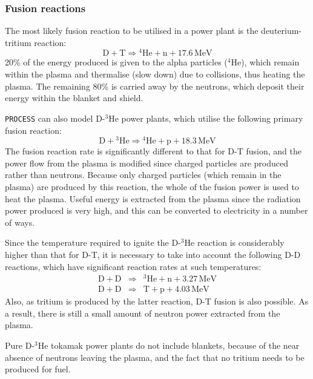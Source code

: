\documentclass[11pt,a4paper]{report}
\newcommand{\process}{\mbox{\texttt{PROCESS}}}
\begin{document}
\subsubsection{Fusion reactions}

The most likely fusion reaction to be utilised in a power plant is the
deuterium-tritium reaction:
\begin{equation}
\mathrm{D + T} \Longrightarrow \mathrm{^{4}He + n + 17.6 \,MeV}
\label{eq:d-t}
\end{equation}
20\% of the energy produced is given to the alpha particles ($^4$He), which
remain within the plasma and thermalise (slow down) due to collisions, thus
heating the plasma. The remaining 80\% is carried away by the neutrons, which
deposit their energy within the blanket and shield.

\process\/ can also model D-$^3$He power plants, which utilise the following primary
fusion reaction:
\begin{equation}
\mathrm{D + \mbox{$^3$He}} \Longrightarrow \mathrm{^{4}He + p + 18.3 \,MeV}
\label{eq:dhe3}
\end{equation}
The fusion reaction rate is significantly different to that for D-T fusion,
and the power flow from the plasma is modified since charged particles are
produced rather than neutrons. Because only charged particles (which remain in
the plasma) are produced by this reaction, the whole of the fusion power is
used to heat the plasma. Useful energy is extracted from the plasma since the
radiation power produced is very high, and this can be converted to
electricity in a number of ways.

Since the temperature required to ignite the D-$^3$He reaction is considerably
higher than that for D-T, it is necessary to take into account the following
D-D reactions, which have significant reaction rates at such temperatures:
\begin{eqnarray}
\mathrm{D + D} & \Longrightarrow & \mathrm{^{3}He + n + 3.27 \,MeV} \\
\mathrm{D + D} & \Longrightarrow & \mathrm{T + p + 4.03 \,MeV}
\end{eqnarray}
Also, as tritium is produced by the latter reaction, D-T fusion is also
possible. As a result, there is still a small amount of neutron power
extracted from the plasma.

Pure D-$^3$He tokamak power plants do not include blankets, because of the near
absence of neutrons leaving the plasma, and the fact that no tritium needs to
be produced for fuel.
\end{document}
